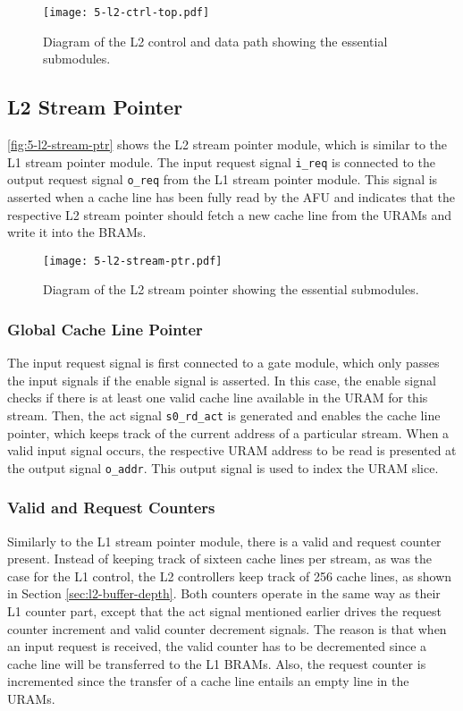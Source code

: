 \begin{figure}[h]
  \centering
  \texttt{[image: 5-l2-ctrl-top.pdf]}
  \caption{Diagram of the L2 control and data path showing the essential submodules.}
  \label{fig:5-l2-ctrl-top}
\end{figure}



\subsection{L2 Stream Pointer}
\autoref{fig:5-l2-stream-ptr} shows the L2 stream pointer module, which is similar to the L1 stream pointer module. The input request signal \texttt{i\_req} is connected to the output request signal \texttt{o\_req} from the L1 stream pointer module. This signal is asserted when a cache line has been fully read by the AFU and indicates that the respective L2 stream pointer should fetch a new cache line from the URAMs and write it into the BRAMs.

\begin{figure}[h]
  \centering
  \texttt{[image: 5-l2-stream-ptr.pdf]}
  \caption{Diagram of the L2 stream pointer showing the essential submodules.}
  \label{fig:5-l2-stream-ptr}
\end{figure}

\subsubsection{Global Cache Line Pointer}
The input request signal is first connected to a gate module, which only passes the input signals if the enable signal is asserted. In this case, the enable signal checks if there is at least one valid cache line available in the URAM for this stream. Then, the act signal \texttt{s0\_rd\_act} is generated and enables the cache line pointer, which keeps track of the current address of a particular stream. When a valid input signal occurs, the respective URAM address to be read is presented at the output signal \texttt{o\_addr}. This output signal is used to index the URAM slice.

\subsubsection{Valid and Request Counters}
Similarly to the L1 stream pointer module, there is a valid and request counter present. Instead of keeping track of sixteen cache lines per stream, as was the case for the L1 control, the L2 controllers keep track of 256 cache lines, as shown in Section \ref{sec:l2-buffer-depth}. Both counters operate in the same way as their L1 counter part, except that the act signal mentioned earlier drives the request counter increment and valid counter decrement signals. The reason is that when an input request is received, the valid counter has to be decremented since a cache line will be transferred to the L1 BRAMs. Also, the request counter is incremented since the transfer of a cache line entails an empty line in the URAMs.

